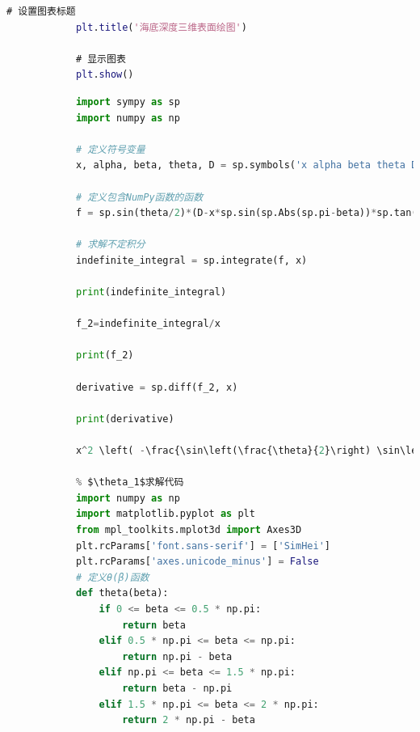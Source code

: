 \documentclass[withoutpreface,bwprint]{cumcmthesis} %
\begin{document}
\begin{appendices}
\begin{lstlisting}[language=Matlab]
            # 设置图表标题
            plt.title('海底深度三维表面绘图')

            # 显示图表
            plt.show()
        \end{lstlisting}

        \begin{lstlisting}[language=Python]
            % 问题一求解代码
            import sympy as sp
            import numpy as np

            # 定义符号变量
            x, alpha, beta, theta, D = sp.symbols('x alpha beta theta D')

            # 定义包含NumPy函数的函数
            f = sp.sin(theta/2)*(D-x*sp.sin(sp.Abs(sp.pi-beta))*sp.tan(alpha))/sp.cos(alpha-theta/2) + sp.sin(theta/2)*(D-x*sp.sin(sp.Abs(sp.pi-beta))*sp.tan(alpha))/sp.cos(alpha+theta/2)

            # 求解不定积分
            indefinite_integral = sp.integrate(f, x)

            print(indefinite_integral)

            f_2=indefinite_integral/x

            print(f_2)

            derivative = sp.diff(f_2, x)

            print(derivative)

            x^2 \left( -\frac{\sin\left(\frac{\theta}{2}\right) \sin\left| \beta - \pi \right| \tan(\alpha)}{2\cos(\alpha + \frac{\theta}{2})} - \frac{\sin\left(\frac{\theta}{2}\right) \sin\left| \beta - \pi \right| \tan(\alpha)}{2\cos(\alpha - \frac{\theta}{2})} \right) + x \left( \frac{D \sin\left(\frac{\theta}{2}\right)}{\cos(\alpha + \frac{\theta}{2})} + \frac{D \sin\left(\frac{\theta}{2}\right)}{\cos(\alpha - \frac{\theta}{2})} \right)

            % $\theta_1$求解代码
            import numpy as np
            import matplotlib.pyplot as plt
            from mpl_toolkits.mplot3d import Axes3D
            plt.rcParams['font.sans-serif'] = ['SimHei']
            plt.rcParams['axes.unicode_minus'] = False
            # 定义θ(β)函数
            def theta(beta):
                if 0 <= beta <= 0.5 * np.pi:
                    return beta
                elif 0.5 * np.pi <= beta <= np.pi:
                    return np.pi - beta
                elif np.pi <= beta <= 1.5 * np.pi:
                    return beta - np.pi
                elif 1.5 * np.pi <= beta <= 2 * np.pi:
                    return 2 * np.pi - beta


\end{lstlisting}
\end{appendices}
\end{document}
